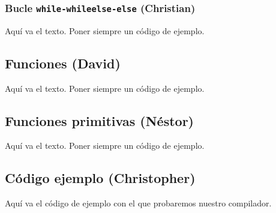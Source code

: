 \documentclass[11pt, english]{article}
\begin{document}
\subsubsection{Bucle \texttt{while-whileelse-else} (Christian)}
Aquí va el texto. Poner siempre un código de ejemplo.


\subsection{Funciones (David)}
Aquí va el texto. Poner siempre un código de ejemplo.
\newpage

\subsection{Funciones primitivas (Néstor)}
Aquí va el texto. Poner siempre un código de ejemplo.
\newpage

\subsection{Código ejemplo (Christopher)}
Aquí va el código de ejemplo con el que probaremos nuestro compilador.
\end{document}
